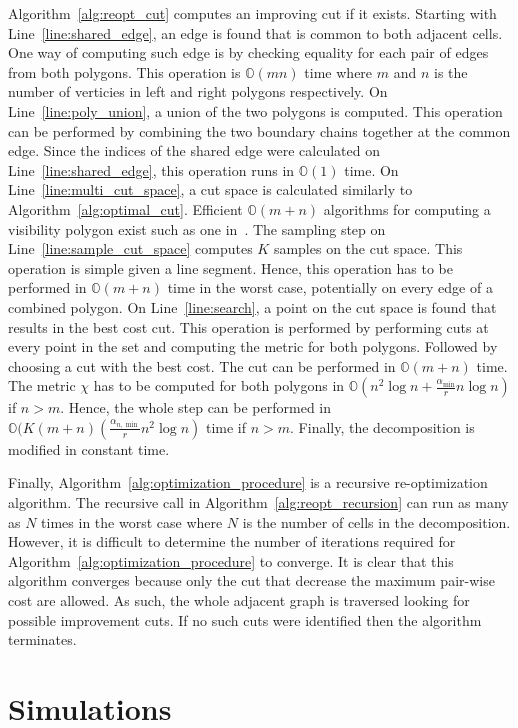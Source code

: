 \documentclass[../main.tex]{subfiles}
\begin{document}
Algorithm~\ref{alg:reopt_cut} computes an improving cut if it exists. Starting with Line~\ref{line:shared_edge}, an edge is found that is common to both adjacent cells. One way of computing such edge is by checking equality for each pair of edges from both polygons. This operation is $\mathbb{O}(mn)$ time where $m$ and $n$ is the number of verticies in left and right polygons respectively. On Line~\ref{line:poly_union}, a union of the two polygons is computed. This operation can be performed by combining the two boundary chains together at the common edge. Since the indices of the shared edge were calculated on Line~\ref{line:shared_edge}, this operation runs in $\mathbb{O}(1)$ time. On Line~\ref{line:multi_cut_space}, a cut space is calculated similarly to Algorithm~\ref{alg:optimal_cut}. Efficient $\mathbb{O}(m+n)$ algorithms for computing a visibility polygon exist such as one in~\cite{el1981linear}. The sampling step on Line~\ref{line:sample_cut_space} computes $K$ samples on the cut space. This operation is simple given a line segment. Hence, this operation has to be performed in $\mathbb{O}(m+n)$ time in the worst case, potentially on every edge of a combined polygon. On Line~\ref{line:search}, a point on the cut space is found that results in the best cost cut. This operation is performed by performing cuts at every point in the set and computing the metric for both polygons. Followed by choosing a cut with the best cost. The cut can be performed in $\mathbb{O}(m+n)$ time. The metric $\chi$ has to be computed for both polygons in $\mathbb{O}(n^2\log{n}+\frac{\alpha_{\min}}{r}n\log{n})$ if $n>m$. Hence, the whole step can be performed in $\mathbb{O}(K(m+n)(\frac{\alpha_{n,\min}}{r}n^2\log{n})$ time if $n>m$. Finally, the decomposition is modified in constant time. 

Finally, Algorithm~\ref{alg:optimization_procedure} is a recursive re-optimization algorithm. The recursive call in Algorithm~\ref{alg:reopt_recursion} can run as many as $N$ times in the worst case where $N$ is the number of cells in the decomposition. However, it is difficult to determine the number of iterations required for Algorithm~\ref{alg:optimization_procedure} to converge. It is clear that this algorithm converges because only the cut that decrease the maximum pair-wise cost are allowed. As such, the whole adjacent graph is traversed looking for possible improvement cuts. If no such cuts were identified then the algorithm terminates.


\section{Simulations}
\label{section:multi_simulations}
\end{document}
